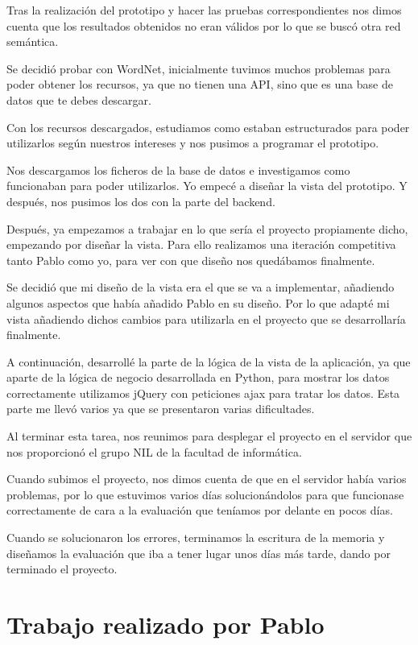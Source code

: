 Tras la realización del prototipo y hacer las pruebas correspondientes nos dimos cuenta que los resultados obtenidos no eran válidos por lo que se buscó otra red semántica.

Se decidió probar con WordNet, inicialmente tuvimos muchos problemas para poder obtener los recursos, ya que no tienen una API, sino que es una base de datos que te debes descargar.


Con los recursos descargados, estudiamos como estaban estructurados para poder utilizarlos según nuestros intereses y nos pusimos a programar el prototipo.

Nos descargamos los ficheros de la base de datos e investigamos como funcionaban para poder utilizarlos. Yo empecé a diseñar la vista del prototipo. Y después, nos pusimos los dos con la parte del backend.


Después, ya empezamos a trabajar en lo que sería el proyecto propiamente dicho, empezando por diseñar la vista. Para ello realizamos una iteración competitiva tanto Pablo como yo, para ver con que diseño nos quedábamos finalmente.

Se decidió que mi diseño de la vista era el que se va a implementar, añadiendo algunos aspectos que había añadido Pablo en su diseño. Por lo que adapté mi vista añadiendo dichos cambios para utilizarla en el proyecto que se desarrollaría finalmente.

A continuación, desarrollé la parte de la lógica de la vista de la aplicación, ya que aparte de la lógica de negocio desarrollada en Python, para mostrar los datos correctamente utilizamos jQuery con peticiones ajax para tratar los datos. Esta parte me llevó varios ya que se presentaron varias dificultades.

Al terminar esta tarea, nos reunimos para desplegar el proyecto en el servidor que nos proporcionó el grupo NIL de la facultad de informática. 

Cuando subimos el proyecto, nos dimos cuenta de que en el servidor había varios problemas, por lo que estuvimos varios días solucionándolos para que funcionase correctamente de cara a la evaluación que teníamos por delante en pocos días.


Cuando se solucionaron los errores, terminamos la escritura de la memoria y diseñamos la evaluación que iba a tener lugar unos días más tarde, dando por terminado el proyecto.


\section{Trabajo realizado por Pablo}
\label{cap:sec:trabajo_Pablo}

